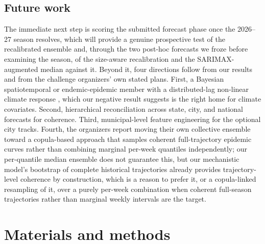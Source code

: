 \documentclass[11pt]{article}
\begin{document}
\subsection{Future work}
The immediate next step is scoring the submitted forecast phase once the 2026--27 season resolves,
which will provide a genuine prospective test of the recalibrated ensemble and, through the
two post-hoc forecasts we froze before examining the season, of the size-aware recalibration
and the SARIMAX-augmented median against it.
Beyond it, four
directions follow from our results and from the challenge organizers' own stated plans. First, a
Bayesian spatiotemporal or endemic-epidemic member with a distributed-lag non-linear climate
response \citep{held2005,meyer2017}, which our negative result suggests is the right home for
climate covariates. Second, hierarchical reconciliation across state, city, and national forecasts
for coherence. Third, municipal-level feature engineering for the optional city tracks. Fourth, the
organizers report moving their own collective ensemble toward a copula-based approach that samples
coherent full-trajectory epidemic curves rather than combining marginal per-week quantiles
independently; our per-quantile median ensemble does not guarantee this, but our mechanistic
model's bootstrap of complete historical trajectories already provides trajectory-level coherence by
construction, which is a reason to prefer it, or a copula-linked resampling of it, over a purely
per-week combination when coherent full-season trajectories rather than marginal weekly intervals
are the target.

\section{Materials and methods}\label{sec:methods}
\end{document}
